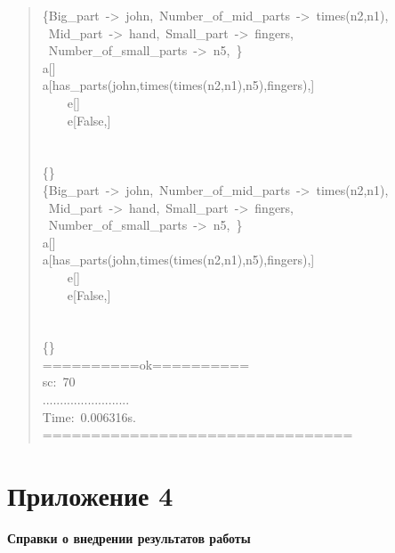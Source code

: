 \begin{quote}
\{Big\_part~->~john,~Number\_of\_mid\_parts~->~times(n2,n1),\\ ~Mid\_part~->~hand,~Small\_part~->~fingers,\\ ~Number\_of\_small\_parts~->~n5,~\}\\
a[]\\
a[has\_parts(john,times(times(n2,n1),n5),fingers),]\\
~~~~e[]\\
~~~~e[False,]\\
~\\
~\\
\{\}\\
\{Big\_part~->~john,~Number\_of\_mid\_parts~->~times(n2,n1),\\ ~Mid\_part~->~hand,~Small\_part~->~fingers,\\~Number\_of\_small\_parts~->~n5,~\}\\
a[]\\
a[has\_parts(john,times(times(n2,n1),n5),fingers),]\\
~~~~e[]\\
~~~~e[False,]\\
~\\
~\\
\{\}\\
==========ok==========\\
sc:~70\\
.........................\\
Time:~0.006316s.\\
================================
\end{quote}


\chapter*{Приложение 4}
\vspace{5cm}

\begin{center}
\textbf{\LARGE{Справки о внедрении результатов работы}}
\end{center}

\newpage
{}~{}
\newpage
{}~{}
\newpage
{}~{}





